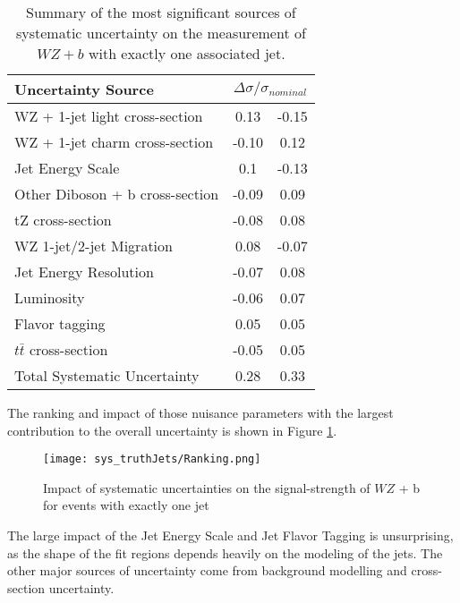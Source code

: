 \begin{table}[H]
    \centering
    \begin{tabular}{l|cc}
        \hline\hline
        Uncertainty Source & \multicolumn{2}{c}{$\Delta \sigma/\sigma_{nominal}$ }  \\
        \hline
        WZ + 1-jet light cross-section & 0.13 & -0.15 \\
        WZ + 1-jet charm cross-section & -0.10 & 0.12 \\
        Jet Energy Scale & 0.1 & -0.13 \\
        Other Diboson + b cross-section & -0.09 & 0.09 \\
        tZ cross-section & -0.08 & 0.08 \\
        WZ 1-jet/2-jet Migration & 0.08 & -0.07 \\
        Jet Energy Resolution & -0.07 & 0.08 \\
        Luminosity & -0.06 & 0.07 \\
        Flavor tagging & 0.05 & 0.05 \\
        $t\bar{t}$ cross-section & -0.05 & 0.05 \\
        \hline
        Total Systematic Uncertainty & 0.28 & 0.33 \\
        \hline\hline
    \end{tabular}
    \caption{Summary of the most significant sources of systematic uncertainty on the measurement of $WZ+b$ with exactly one associated jet.}
    \label{tab:systematics_1j}
\end{table}

The ranking and impact of those nuisance parameters with the largest contribution to the overall uncertainty is shown in Figure \ref{fig:ranking_1j}.

\begin{figure}[H]
    \centering
    \texttt{[image: sys\_truthJets/Ranking.png]}
    \caption{Impact of systematic uncertainties on the signal-strength of $WZ$ + b for events with exactly one jet}
    \label{fig:ranking_1j}
\end{figure}

The large impact of the Jet Energy Scale and Jet Flavor Tagging is unsurprising, as the shape of the fit regions depends heavily on the modeling of the jets. The other major sources of uncertainty come from background modelling and cross-section uncertainty. %

